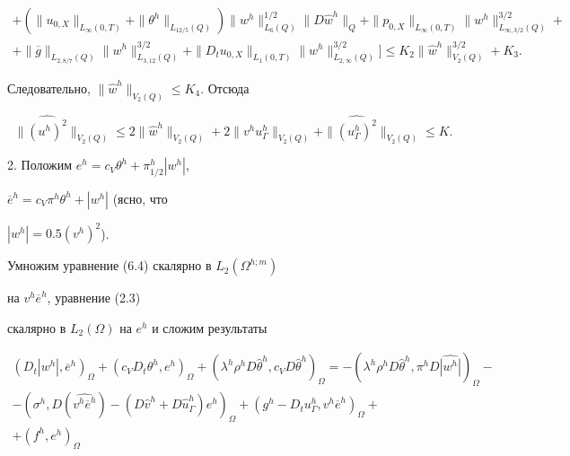 \begin{pf}
\begin{multline*}
+(\|u_{0,X}\|_{L_\infty(0,T)}+\|\theta^h\|_{L_{12/5}(Q)})


\|w^h\|^{1/2}_{L_6(Q)}\|D\widehat w^h\|_Q+\|p_{0,X}\|_{L_\infty(0,T)}


\|w^h\|^{3/2}_{L_{\infty,3/2}(Q)}+\\


+\|\overline g\|_{L_{2,8/7}(Q)}\|w^h\|^{3/2}_{L_{3,12}(Q)}


+\|D_tu_{0,X}\|_{L_1(0,T)}\|w^h\|^{3/2}_{L_{2,\infty}(Q)}\big]\le


K_2\|\widehat w^h\|_{V_2(Q)}^{3/2}+K_3.


\end{multline*}


Следовательно, $\|\widehat w^h\|_{V_2(Q)}\le K_4$. Отсюда


$$


\|\widehat{(u^h)^2}\|_{V_2(Q)}\le 2\|\widehat w^h\|_{V_2(Q)}+


2\|\widehat{v^hu^h_\Gamma}\|_{V_2(Q)}+


\|\widehat{(u^h_\Gamma)^2}\|_{V_2(Q)}\le K.


$$





2. Положим $e^h=c_V\theta^h+\pi^h_{1/2}|w^h|$,


$\overline e^h=c_V\pi^h\theta^h+|w^h|$ (ясно, что


$|w^h|=0.5(v^h)^2$).


Умножим уравнение (6.4) скалярно в $L_2(\Omega^{h;m})$


на $v^h\overline e^h$, уравнение (2.3)


скалярно в $L_2(\Omega)$ на $e^h$ и сложим результаты


\begin{multline*}


(D_t|w^h|,\overline e^h)_\Omega+(c_VD_t\theta^h,e^h)_\Omega


+(\lambda^h\rho^hD\widehat\theta^h,c_VD\widehat \theta^h)_\Omega


=-(\lambda^h\rho^hD\widehat\theta^h,\pi^hD\widehat{|w^h|})_\Omega-\\


-(\sigma^h,D(\widehat{v^h\overline e^h})-


(D\widehat v^h+D\widehat u^h_\Gamma)e^h)_\Omega


+(g^h-D_tu^h_\Gamma,v^h\overline e^h)_\Omega+\\


+(f^h,e^h)_\Omega



\end{multline*}
\end{pf}
